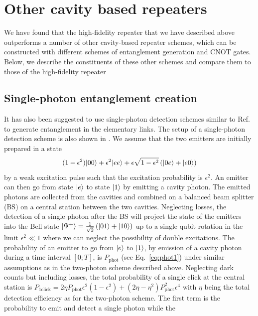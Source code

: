 \section{Other cavity based repeaters} \label{sec:other} 

We have found that the high-fidelity repeater that we have described above
outperforms a number of other cavity-based repeater schemes, which can be
constructed with different schemes of entanglement generation and CNOT gates.
Below, we describe the constituents of these other schemes and compare them to
those of the high-fidelity repeater

\subsection{Single-photon entanglement creation} \label{sec:1phot}
It has also been suggested to use single-photon detection schemes similar to
Ref.~\cite{huelga} to generate entanglement in the elementary links. The setup
of a single-photon detection scheme is also shown in . We
assume that the two emitters are initially prepared in a state
\begin{equation}
(1-\epsilon^{2})| 00 \rangle+\epsilon^{2}
| ee \rangle+\epsilon\sqrt{1-\epsilon^{2}}\left(| 0e \rangle+| e0 \rangle\right)
\end{equation}    
by a weak excitation pulse such that the excitation probability is
$\epsilon^{2}$. An emitter can then go from state $| e \rangle$ to state $| 1 \rangle$
by emitting a cavity photon. The emitted photons are collected from the cavities
and combined on a balanced beam splitter (BS) on a central station between the
two cavities. Neglecting losses, the detection of a single photon after the BS
will project the state of the emitters into the Bell state
$| \Psi^{+} \rangle=\frac{1}{\sqrt{2}}\left(| 01 \rangle+| 10 \rangle\right)$ up to a single
qubit rotation in the limit $\epsilon^{2}\ll1$ where we can neglect the
possibility of double excitations. The probability of an emitter to go from
$| e \rangle$ to $| 1 \rangle$, by emission of a cavity photon during a time interval
$[0;T]$, is $P_{\text{phot}}$ (see Eq.~\eqref{eq:phot1}) under similar
assumptions as in the two-photon scheme described above. Neglecting dark counts
but including losses, the total probability of a single click at the central
station is $P_{\text{1click}}=2\eta
P_{\text{phot}}\epsilon^{2}(1-\epsilon^{2})+(2\eta-\eta^{2})P_{\text{phot}}^{2}\epsilon^{4}$
with $\eta$ being the total detection efficiency as for the two-photon scheme.
The first term is the probability to emit and detect a single photon while the

